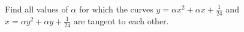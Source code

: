 Find all values of $\alpha$ for which the curves $y = \alpha x^2 +
\alpha x + \frac{1}{24}$ and $x = \alpha y^2 + \alpha y + \frac{1}{24}$
are tangent to each other.
